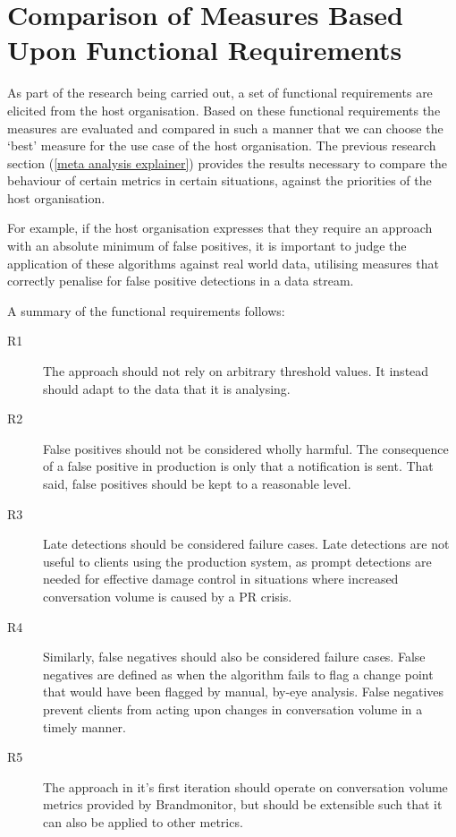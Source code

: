 \documentclass{uvamscse}	%
\begin{document}
\section{Comparison of Measures Based Upon Functional Requirements}

As part of the research being carried out, a set of functional requirements are elicited from the host organisation. Based on these functional requirements the measures are evaluated and compared in such a manner that we can choose the `best' measure for the use case of the host organisation. The previous research section (\autoref{meta analysis explainer}) provides the results necessary to compare the behaviour of certain metrics in certain situations, against the priorities of the host organisation.

For example, if the host organisation expresses that they require an approach with an absolute minimum of false positives, it is important to judge the application of these algorithms against real world data, utilising measures that correctly penalise for false positive detections in a data stream.

A summary of the functional requirements follows:

\begin{description}
    \item[R1] The approach should not rely on arbitrary threshold values. It instead should adapt to the data that it is analysing.
    \item[R2] False positives should not be considered wholly harmful. The consequence of a false positive in production is only that a notification is sent. That said, false positives should be kept to a reasonable level.
    \item[R3] Late detections should be considered failure cases. Late detections are not useful to clients using the production system, as prompt detections are needed for effective damage control in situations where increased conversation volume is caused by a PR crisis.
    \item[R4] Similarly, false negatives should also be considered failure cases. False negatives are defined as when the algorithm fails to flag a change point that would have been flagged by manual, by-eye analysis. False negatives prevent clients from acting upon changes in conversation volume in a timely manner.
    \item[R5] The approach in it's first iteration should operate on conversation volume metrics provided by Brandmonitor, but should be extensible such that it can also be applied to other metrics.
\end{description}
\end{document}
